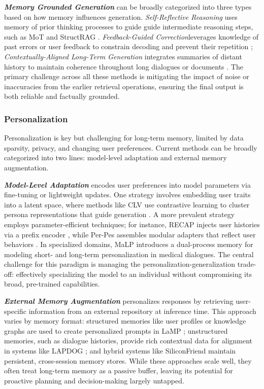 \documentclass[manuscript,screen]{acmart}
\begin{document}
\textit{\textbf{Memory Grounded Generation}} can be broadly categorized into three types based on how memory influences generation. \textit{Self-Reflective Reasoning} uses memory of prior thinking processes to guide guide intermediate reasoning steps, such as MoT \citep{li-qiu-2023-mot} and StructRAG \citep{li2024structrag}. \textit{Feedback-Guided Correction}leverages knowledge of past errors or user feedback to constrain decoding and prevent their repetition \citep{qian2024memorag, tandon2021learning}; \textit{Contextually-Aligned Long-Term Generation} integrates summaries of distant history to maintain coherence throughout long dialogues or documents \citep{chen2024compress, lu2023memochat}. The primary challenge across all these methods is mitigating the impact of noise or inaccuracies from the earlier retrieval operations, ensuring the final output is both reliable and factually grounded.

\subsubsection{Personalization}
Personalization is key but challenging for long-term memory, limited by data sparsity, privacy, and changing user preferences. Current methods can be broadly categorized into two lines: model-level adaptation and external memory augmentation.

\textit{\textbf{Model-Level Adaptation}} encodes user preferences into model parameters via fine-tuning or lightweight updates. One strategy involves embedding user traits into a latent space, where methods like CLV use contrastive learning to cluster persona representations that guide generation \citep{tang-etal-2023-enhancing-personalized}. A more prevalent strategy employs parameter-efficient techniques; for instance, RECAP injects user histories via a prefix encoder \citep{liu2023recap}, while Per-Pes assembles modular adapters that reflect user behaviors \citep{tan2024personalized}. In specialized domains, MaLP \citep{zhang-etal-2024-llm-based} introduces a dual-process memory for modeling short- and long-term personalization in medical dialogues. The central challenge for this paradigm is managing the personalization-generalization trade-off: effectively specializing the model to an individual without compromising its broad, pre-trained capabilities.

\textit{\textbf{External Memory Augmentation}} personalizes responses by retrieving user-specific information from an external repository at inference time. This approach varies by memory format: structured memories like user profiles or knowledge graphs are used to create personalized prompts in LaMP \citep{salemi2023lamp}; unstructured memories, such as dialogue histories, provide rich contextual data for alignment in systems like LAPDOG \citep{huang-etal-2023-learning}; and hybrid systems like SiliconFriend \citep{zhong2024memorybank} maintain persistent, cross-session memory stores. While these approaches scale well, they often treat long-term memory as a passive buffer, leaving its potential for proactive planning and decision-making largely untapped.
\end{document}
